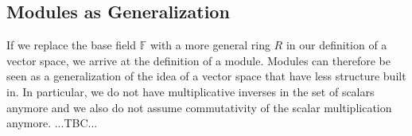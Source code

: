 









\subsection{Modules as Generalization}
If we replace the base field $\mathbb{F}$ with a more general ring $R$ in our definition of a vector space, we arrive at the definition of a module. Modules can therefore be seen as a generalization of the idea of a vector space that have less structure built in. In particular, we do not have multiplicative inverses in the set of scalars anymore and we also do not assume commutativity of the scalar multiplication anymore. ...TBC...





